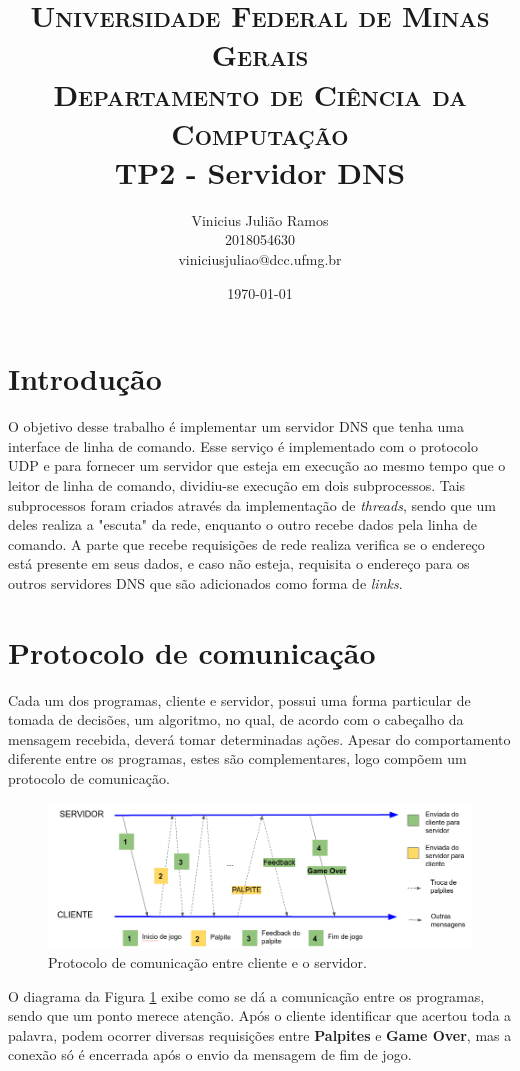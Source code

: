 \documentclass[10pt]{extarticle}
\title{ \textsc{Universidade Federal de Minas Gerais} \\
\textsc{Departamento de Ciência da Computação}\\
\bigskip TP2 - Servidor DNS}
\author{Vinicius Julião Ramos \\ 
\normalsize{2018054630} \\
\normalsize{viniciusjuliao@dcc.ufmg.br}}
\date{\today}
\begin{document}
\maketitle

\section{Introdução}

O objetivo desse trabalho é implementar um servidor DNS que tenha uma interface
de linha de comando.
Esse serviço é implementado com o protocolo UDP e para fornecer um servidor que
esteja em execução ao mesmo tempo que o leitor de linha de comando, dividiu-se
execução em dois subprocessos.
Tais subprocessos foram criados através da implementação de \textit{threads},
sendo que um deles realiza a "escuta" da rede, enquanto o outro recebe dados
pela linha de comando.
A parte que recebe requisições de rede realiza verifica se o endereço está presente
em seus dados, e caso não esteja, requisita o endereço para os outros servidores
DNS que são adicionados como forma de \textit{links}.

\section{Protocolo de comunicação}
Cada um dos programas, cliente e servidor, possui uma forma particular de tomada de decisões, um algoritmo, no qual, de acordo com o cabeçalho da mensagem recebida, deverá tomar determinadas ações. Apesar do comportamento diferente entre os programas, estes são complementares, logo compõem um protocolo de comunicação.

\begin{figure}[h]
	\begin{center}
		\includegraphics[scale=0.5]{Figuras/diagrama.png}
	\end{center}
	\caption{\label{fig:diagrama} Protocolo de comunicação entre cliente e o servidor.}
\end{figure}

O diagrama da Figura \ref{fig:diagrama} exibe como se dá a comunicação entre os programas, sendo que um ponto merece atenção. Após o cliente identificar que acertou toda a palavra, podem ocorrer diversas requisições entre \textbf{Palpites} e \textbf{Game Over}, mas a conexão só é encerrada após o envio da mensagem de fim de jogo.
\end{document}
